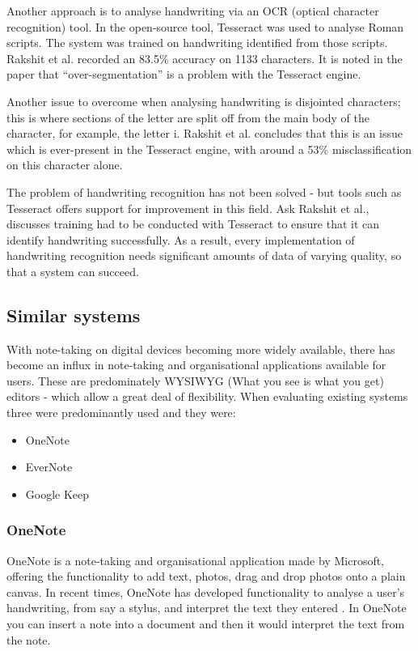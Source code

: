 Another approach is to analyse handwriting via an OCR (optical character recognition) tool. In \cite{citeulike:13920972} the open-source tool, Tesseract \cite{citeulike:14014368} was used to analyse Roman scripts. The system was trained on handwriting identified from those scripts. Rakshit et al. recorded an 83.5\% accuracy on 1133 characters. It is noted in the paper that ``over-segmentation'' is a problem with the Tesseract engine.

Another issue to overcome when analysing handwriting is disjointed characters; this is where sections of the letter are split off from the main body of the character, for example, the letter i. Rakshit et al. concludes that this is an issue which is ever-present in the Tesseract engine, with around a 53\% misclassification on this character alone.

The problem of handwriting recognition has not been solved - but tools such as Tesseract offers support for improvement in this field. Ask Rakshit et al., discusses training had to be conducted with Tesseract to ensure that it can identify handwriting successfully. As a result, every implementation of handwriting recognition needs significant amounts of data of varying quality, so that a system can succeed.

\subsection{Similar systems}
With note-taking on digital devices becoming more widely available, there has become an influx in note-taking and organisational applications available for users. These are predominately WYSIWYG (What you see is what you get) editors - which allow a great deal of flexibility. When evaluating existing systems three were predominantly used and they were:
\begin{itemize}
  \item OneNote
  \item EverNote
  \item Google Keep
\end{itemize}

\subsubsection{OneNote}
OneNote \cite{citeulike:onenote} is a note-taking and organisational application made by Microsoft, offering the functionality to add text, photos, drag and drop photos onto a plain canvas. In recent times, OneNote has developed functionality to analyse a user's handwriting, from say a stylus, and interpret the text they entered \cite{citeulike:14014236}. In OneNote you can insert a note into a document and then it would interpret the text from the note.

